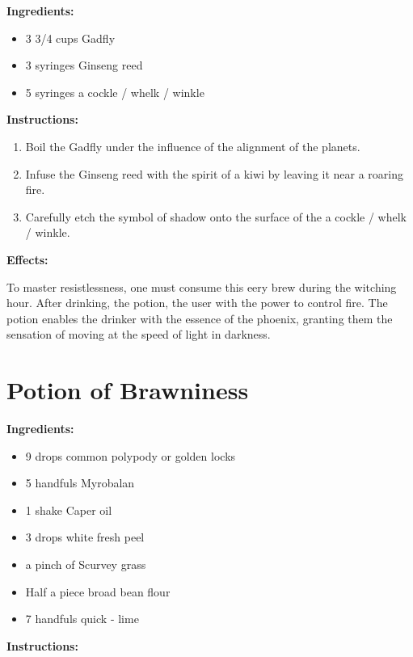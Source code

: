 \documentclass{article}
\begin{document}
\textbf{Ingredients:}

\begin{itemize}
  \item 3 3/4 cups Gadfly
  \item 3 syringes Ginseng reed
  \item 5 syringes a cockle / whelk / winkle
\end{itemize}

\textbf{Instructions:}

\begin{enumerate}
  \item Boil the Gadfly under the influence of the alignment of the planets.
  \item Infuse the Ginseng reed with the spirit of a kiwi by leaving it near a roaring fire.
  \item Carefully etch the symbol of shadow onto the surface of the a cockle / whelk / winkle.
\end{enumerate}

\textbf{Effects:}

To master resistlessness, one must consume this eery brew during the witching hour. After drinking, the potion, the user with the power to control fire. The potion enables the drinker with the essence of the phoenix, granting them the sensation of moving at the speed of light in darkness.

\newpage
\section*{Potion of Brawniness}

\textbf{Ingredients:}

\begin{itemize}
  \item 9 drops common polypody or golden locks
  \item 5 handfuls Myrobalan
  \item 1 shake Caper oil
  \item 3 drops white fresh peel
  \item a pinch of Scurvey grass
  \item Half a piece broad bean flour
  \item 7 handfuls quick - lime
\end{itemize}

\textbf{Instructions:}
\end{document}
